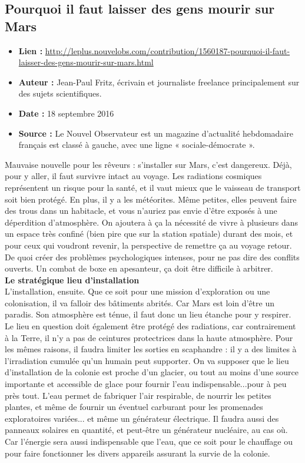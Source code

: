 \documentclass[8pt]{article}
\begin{document}
\newpage

\subsection{Pourquoi il faut laisser des gens mourir sur Mars}
\begin{itemize}
	\item \textbf{Lien : }  \url{http://leplus.nouvelobs.com/contribution/1560187-pourquoi-il-faut-laisser-des-gens-mourir-sur-mars.html} 
	\item \textbf{Auteur : } Jean-Paul Fritz, écrivain et journaliste freelance principalement sur des sujets scientifiques.
	\item \textbf{Date : }   18 septembre 2016
	\item \textbf{Source : } Le Nouvel Observateur est un magazine d'actualité hebdomadaire français est classé à gauche, avec une ligne « sociale-démocrate ».
\end{itemize}

Mauvaise nouvelle pour les rêveurs : s'installer sur Mars, c'est dangereux. Déjà, pour y aller, il faut survivre intact au voyage. Les radiations cosmiques représentent un risque pour la santé, et il vaut mieux que le vaisseau de transport soit bien protégé. En plus, il y a les météorites. Même petites, elles peuvent faire des trous dans un habitacle, et vous n'auriez pas envie d'être exposés à une déperdition d'atmosphère.
On ajoutera à ça la nécessité de vivre à plusieurs dans un espace très confiné (bien pire que sur la station spatiale) durant des mois, et pour ceux qui voudront revenir, la perspective de remettre ça au voyage retour. De quoi créer des problèmes psychologiques intenses, pour ne pas dire des conflits ouverts. Un combat de boxe en apesanteur, ça doit être difficile à arbitrer.\\

\textbf{Le stratégique lieu d'installation}\\

L'installation, ensuite. Que ce soit pour une mission d'exploration ou une colonisation, il va falloir des bâtiments abrités. Car Mars est loin d'être un paradis. Son atmosphère est ténue, il faut donc un lieu étanche pour y respirer. Le lieu en question doit également être protégé des radiations, car contrairement à la Terre, il n'y a pas de ceintures protectrices dans la haute atmosphère. Pour les mêmes raisons, il faudra limiter les sorties en scaphandre : il y a des limites à l'irradiation cumulée qu'un humain peut supporter. 
On va supposer que le lieu d'installation de la colonie est proche d'un glacier, ou tout au moins d'une source importante et accessible de glace pour fournir l'eau indispensable...pour à peu près tout. L'eau permet de fabriquer l'air respirable, de nourrir les petites plantes, et même de fournir un éventuel carburant pour les promenades exploratoires variées... et même un générateur électrique.
Il faudra aussi des panneaux solaires en quantité, et peut-être un générateur nucléaire, au cas où. Car l'énergie sera aussi indispensable que l'eau, que ce soit pour le chauffage ou pour faire fonctionner les divers appareils assurant la survie de la colonie.\\
\end{document}
